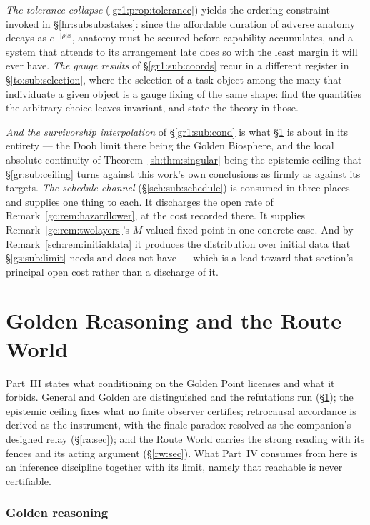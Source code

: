 \documentclass[11pt]{article}
\numberwithin{equation}{section}
\theoremstyle{plain}
\theoremstyle{definition}
\theoremstyle{remark}
\begin{document}
\emph{The tolerance collapse} (\ref{gr1:prop:tolerance}) yields the
ordering constraint invoked in \S\ref{hr:subsub:stakes}: since the
affordable duration of adverse anatomy decays as $e^{-|\rho|x}$, anatomy
must be secured before capability accumulates, and a system that
attends to its arrangement late does so with the least margin it will
ever have. \emph{The gauge results} of \S\ref{gr1:sub:coords} recur in a different
register in \S\ref{to:sub:selection}, where the selection of a
task-object among the many that individuate a given object is a gauge
fixing of the same shape: find the quantities the arbitrary choice
leaves invariant, and state the theory in those.

\emph{And the survivorship interpolation} of \S\ref{gr1:sub:cond} is
what \S\ref{gr:sec} is about in its entirety --- the Doob limit there
being the Golden Biosphere, and the local absolute continuity of
Theorem~\ref{sh:thm:singular} being the epistemic ceiling that
\S\ref{gr:sub:ceiling} turns against this work's own conclusions as
firmly as against its targets. \emph{The schedule channel} (\S\ref{sch:sub:schedule}) is consumed in
three places and supplies one thing to each. It discharges the open rate
of Remark~\ref{gc:rem:hazardlower}, at the cost recorded there. It
supplies Remark~\ref{gc:rem:twolayers}'s $M$-valued fixed point in one
concrete case. And by Remark~\ref{sch:rem:initialdata} it produces the
distribution over initial data that \S\ref{gs:sub:limit} needs and does
not have --- which is a lead toward that section's principal open cost
rather than a discharge of it.

\part{Golden Reasoning and the Route World}

\noindent Part~III states what conditioning on the Golden Point
licenses and what it forbids. General and Golden are distinguished
and the refutations run (\S\ref{gr:sec}); the epistemic ceiling fixes
what no finite observer certifies; retrocausal accordance is derived
as the instrument, with the finale paradox resolved as the
companion's designed relay (\S\ref{ra:sec}); and the Route World
carries the strong reading with its fences and its acting argument
(\S\ref{rw:sec}). What Part~IV consumes from here is an inference
discipline together with its limit, namely that reachable is never
certifiable.

\section{Golden reasoning}\label{gr:sec}
\setcounter{premise}{0} %
\end{document}
